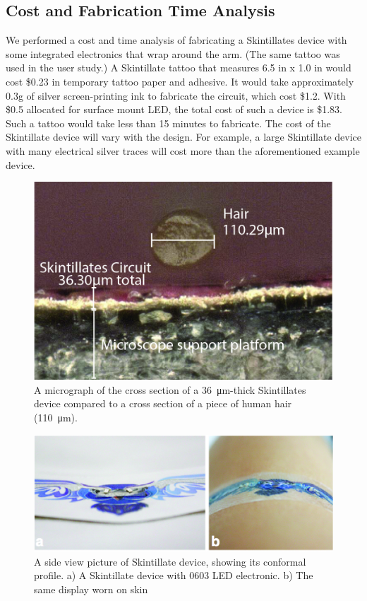 \documentclass{sigchi}
\begin{document}
\subsection{Cost and Fabrication Time Analysis}
We performed a cost and time analysis of fabricating a Skintillates device with some integrated electronics that wrap around the arm. (The same tattoo was used in the user study.) A Skintillate tattoo that measures 6.5 in x 1.0 in would cost \$0.23 in temporary tattoo paper and adhesive. It would take approximately 0.3g of silver screen-printing ink to fabricate the circuit, which cost \$1.2. With \$0.5 allocated for surface mount LED, the total cost of such a device is \$1.83. Such a tattoo would take less than 15 minutes to fabricate. The cost of the Skintillate device will vary with the design. For example, a large Skintillate device with many electrical silver traces will cost more than the aforementioned example device.  

\begin{figure}[!ht]
\centering
\includegraphics[width=1\columnwidth]{figures/Figure2}
\caption{A micrograph of the cross section of a \SI{36}{\micro\metre}-thick Skintillates device compared to a cross section of a piece of human
hair (\SI{110}{\micro\metre}).}
\vspace{-8pt}
\label{fig:micrograph}
\end{figure}

\begin{figure}
\centering
\includegraphics[width=0.9\columnwidth]{figures/LED0603}
\caption{A side view picture of Skintillate device, showing its conformal profile. a) A Skintillate device with 0603 LED electronic. b) The same display worn on skin}
\vspace{-8pt}
\label{fig:LED0603}
\end{figure}
\end{document}
